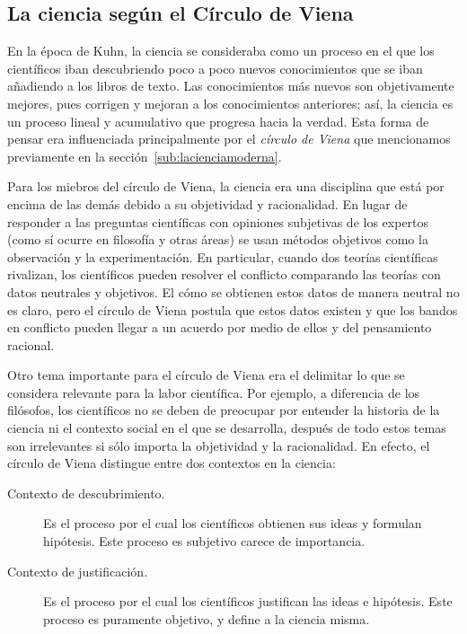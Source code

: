 \subsection*{La ciencia según el Círculo de Viena}
\label{sub:circulodeviena}
En la época de Kuhn, la ciencia se consideraba como un proceso en el que los
científicos iban descubriendo poco a poco nuevos conocimientos que se iban
añadiendo a los libros de texto.
Las conocimientos más nuevos son objetivamente mejores, pues corrigen y mejoran
a los conocimientos anteriores; así, la ciencia es un proceso lineal y
acumulativo que progresa hacia la verdad.
Esta forma de pensar era influenciada principalmente por el \emph{círculo de
    Viena} que mencionamos previamente en la sección~\ref{sub:lacienciamoderna}.

Para los miebros del círculo de Viena, la ciencia era una disciplina que está
por encima de las demás debido a su objetividad y racionalidad.
En lugar de responder a las preguntas científicas con opiniones subjetivas de
los expertos (como sí ocurre en filosofía y otras áreas) se usan métodos
objetivos como la observación y la experimentación.
En particular, cuando dos teorías científicas rivalizan, los científicos pueden
resolver el conflicto comparando las teorías con datos neutrales y objetivos.
El cómo se obtienen estos datos de manera neutral no es claro, pero el círculo
de Viena postula que estos datos existen y que los bandos en conflicto pueden
llegar a un acuerdo por medio de ellos y del pensamiento racional.

Otro tema importante para el círculo de Viena era el delimitar lo que se
considera relevante para la labor científica.
Por ejemplo, a diferencia de los filósofos, los científicos no se deben de
preocupar por entender la historia de la ciencia ni el contexto social en el que
se desarrolla, después de todo estos temas son irrelevantes si sólo importa la
objetividad y la racionalidad.
En efecto, el círculo de Viena distingue entre dos contextos en la ciencia:
\begin{description}
    \item[Contexto de descubrimiento.] Es el proceso por el cual los científicos
        obtienen sus ideas y formulan hipótesis.
        Este proceso es subjetivo carece de importancia.
    \item[Contexto de justificación.] Es el proceso por el cual los científicos
        justifican las ideas e hipótesis.
        Este proceso es puramente objetivo, y define a la ciencia misma.
\end{description}


